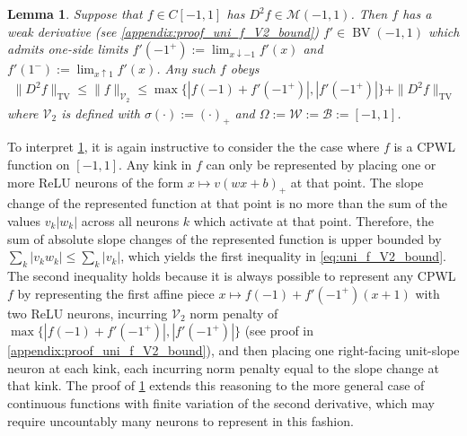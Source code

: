 \documentclass{article}
\DeclareMathOperator{\TV}{TV}
\DeclareMathOperator{\BV}{BV}
\def\cB{{\mathcal{B}}}
\def\cM{{\mathcal{M}}}
\def\cV{{\mathcal{V}}}
\def\cW{{\mathcal{W}}}
\newtheorem{lemma}[theorem]{Lemma}
\begin{document}
\begin{lemma} \label{lemma:uni_f_V2_bound}
    Suppose that $f \in C[-1,1]$ has $D^2 f \in \cM(-1,1)$. Then $f$ has a weak derivative (see \cref{appendix:proof_uni_f_V2_bound}) $f' \in \BV(-1,1)$ which admits one-side limits $f'(-1^{+}) := \lim_{x \downarrow -1} f'(x)$ and $f'(1^{-}) := \lim_{x \uparrow 1} f'(x)$. Any such $f$ obeys
    \begin{align} \label{eq:uni_f_V2_bound}
        \| D^2 f \|_{\TV} \leq \| f \|_{\cV_2} \leq \max\{ |f(-1)+f'(-1^{+})|, |f'(-1^{+})|  \} + \| D^2 f \|_{\TV}
    \end{align}
    where $\cV_2$ is defined with $\sigma(\cdot) := (\cdot)_+$ and $\Omega := \cW := \cB := [-1,1]$.
\end{lemma}
To interpret \cref{lemma:uni_f_V2_bound}, it is again instructive to consider the the case where $f$ is a CPWL function on $[-1,1]$. Any kink in $f$ can only be represented by placing one or more ReLU neurons of the form $x \mapsto v(wx+b)_+$ at that point. The slope change of the represented function at that point is no more than the sum of the values $v_k |w_k|$ across all neurons $k$ which activate at that point. Therefore, the sum of absolute slope changes of the represented function is upper bounded by $\sum_k |v_k w_k| \leq \sum_k |v_k|$, which yields the first inequality in \eqref{eq:uni_f_V2_bound}. The second inequality holds because it is always possible to represent any CPWL $f$ by representing the first affine piece $x \mapsto f(-1) + f'(-1^+)(x+1)$ with two ReLU neurons, incurring $\cV_2$ norm penalty of $\max\{ |f(-1)+f'(-1^+)|, |f'(-1^+)| \}$ (see proof in \cref{appendix:proof_uni_f_V2_bound}), and then placing one right-facing unit-slope neuron at each kink, each incurring norm penalty equal to the slope change at that kink. The proof of \cref{lemma:uni_f_V2_bound} extends this reasoning to the more general case of continuous functions with finite variation of the second derivative, which may require uncountably many neurons to represent in this fashion.
\end{document}
